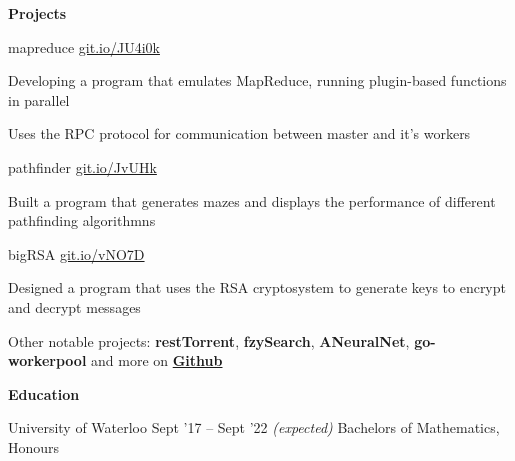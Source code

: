 \documentclass{resume} %
\DeclareRobustCommand{\&}{%
  \ifdim\fontdimen1\font>0pt
    \textsl{\symbol{`\&}}%
  \else
    \symbol{`\&}%
  \fi
}
\begin{document}

\begin{rSection}{\textbf{Projects}}

\begin{rProjectSection}{mapreduce}
		{{\href{https://github.com/MSJawad/mapreduce}
				{git.io/JU4i0k}}}
			\item Developing a program that emulates MapReduce, running plugin-based functions in parallel
			\item Uses the RPC protocol for communication between master and it's workers
		
	\end{rProjectSection}

  \begin{rProjectSection}{pathfinder}
	  {{\href{https://github.com/MSJawad/pathfinder}
		    {git.io/JvUHk}}}

    \item Built a program that generates mazes and displays the performance of different pathfinding algorithmns
    
    \end{rProjectSection}

\begin{rProjectSection}{bigRSA}
	{{\href{https://github.com/MSJawad/bigRSA}
			{git.io/vNO7D}}}
	
	\item Designed a program that uses the RSA cryptosystem to generate keys to encrypt and decrypt messages
	
\end{rProjectSection}
    
	
\begin{rMinisection}
      \item {Other notable projects:} {\textbf{restTorrent}},{ \textbf{fzySearch}},
     {\textbf{ANeuralNet}}, {\textbf{go-workerpool}} and more on
      \href{https://github.com/MSJawad}{\textbf{Github}}
 \end{rMinisection}
\end{rSection}


\begin{rSection}{\textbf{Education}}
  \begin{rEducationSection}{University of Waterloo}
		     {Sept '17 -- Sept '22 \emph{(expected)}}
		     {Bachelors of Mathematics, Honours}
  \end{rEducationSection}
\end{rSection} 
\end{document}
